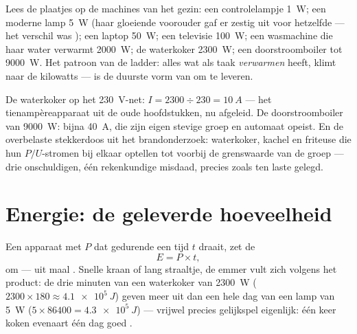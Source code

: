 \begin{example}[De huishoudladder]\label{ex:g9:electric-power-energy:ladder}
Lees de plaatjes op de machines van het gezin: een controlelampje
\qty{1}{W}; een moderne lamp \qty{5}{W} (haar gloeiende voorouder gaf
er zestig uit voor hetzelfde  --- het verschil was
); een laptop \qty{50}{W}; een televisie \qty{100}{W};
een wasmachine die haar water verwarmt \qty{2000}{W}; de waterkoker
\qty{2300}{W}; een doorstroomboiler tot \qty{9000}{W}. Het patroon van
de ladder: alles wat als taak \emph{verwarmen} heeft, klimt naar de
kilowatts ---  is de duurste vorm van  om te
leveren.
\end{example}

\begin{example}\label{ex:g9:electric-power-energy:fuses}
De waterkoker op het \qty{230}{V}-net: $I = 2300 \div 230 =
\qty{10}{A}$ --- het tienampèreapparaat uit de oude
hoofdstukken, nu afgeleid. De doorstroomboiler van \qty{9000}{W}: bijna
\qty{40}{A}, die zijn eigen stevige groep en automaat opeist. En de
overbelaste stekkerdoos uit het brandonderzoek: waterkoker, kachel en
friteuse die hun $P/U$-stromen bij elkaar optellen tot voorbij de
grenswaarde van de groep --- drie onschuldigen, één
rekenkundige misdaad, precies zoals ten laste gelegd.
\end{example}

\section{Energie: de geleverde hoeveelheid}

\begin{proposition}\label{prop:g9:electric-power-energy:Pt}
Een apparaat met  $P$ dat gedurende een tijd $t$ draait,
zet de 
\[
E = P \times t ,
\]
om ---  uit  maal . Snelle kraan
of lang straaltje, de emmer vult zich volgens het product: de drie
minuten van een waterkoker van \qty{2300}{W} ($2300 \times 180 \approx
\qty{4.1e5}{J}$) geven meer uit dan een hele dag van een lamp van
\qty{5}{W} ($5 \times 86400 = \qty{4.3e5}{J}$) --- vrijwel precies
gelijkspel eigenlijk: één keer koken evenaart één dag goed
.
\end{proposition}

